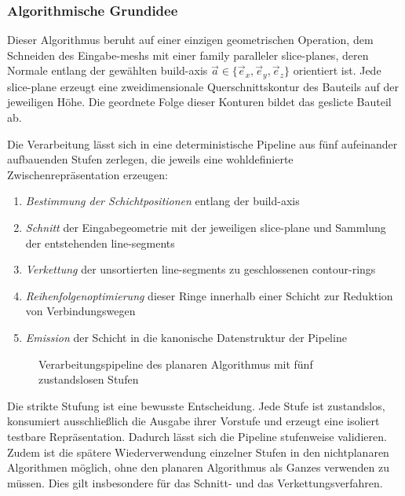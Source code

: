             \subsubsection{Algorithmische Grundidee}\label{subsubsec:concept-planar-core-idea}
                Dieser Algorithmus beruht auf einer einzigen geometrischen Operation, dem Schneiden des Eingabe-\glspl{mesh} mit einer \gls{family} paralleler \glspl{slice-plane}, deren Normale entlang der gewählten \gls{build-axis} $\vec{a} \in \{\vec{e}_x, \vec{e}_y, \vec{e}_z\}$ orientiert ist.
                Jede \gls{slice-plane} erzeugt eine zweidimensionale Querschnittskontur des Bauteils auf der jeweiligen Höhe.
                Die geordnete Folge dieser Konturen bildet das geslicte Bauteil ab.

                Die Verarbeitung lässt sich in eine deterministische Pipeline aus fünf aufeinander aufbauenden Stufen zerlegen, die jeweils eine wohldefinierte Zwischenrepräsentation erzeugen:
                \begin{enumerate}
                    \item \emph{Bestimmung der Schichtpositionen} entlang der \gls{build-axis}
                    \item \emph{Schnitt} der Eingabegeometrie mit der jeweiligen \gls{slice-plane} und Sammlung der entstehenden \glspl{line-segment}
                    \item \emph{Verkettung} der unsortierten \glspl{line-segment} zu geschlossenen \glspl{contour-ring}
                    \item \emph{Reihenfolgenoptimierung} dieser Ringe innerhalb einer Schicht zur Reduktion von Verbindungswegen
                    \item \emph{Emission} der Schicht in die kanonische Datenstruktur der Pipeline
                \end{enumerate}

                \begin{figure}[!ht]
                    \centering
                    
                    \caption[Verarbeitungspipeline des planaren Algorithmus]{
                        Verarbeitungspipeline des planaren Algorithmus mit fünf zustandslosen Stufen
                    }
                    \label{fig:concept-planar-pipeline}
                \end{figure}

                Die strikte Stufung ist eine bewusste Entscheidung.
                Jede Stufe ist zustandslos, konsumiert ausschließlich die Ausgabe ihrer Vorstufe und erzeugt eine isoliert testbare Repräsentation.
                Dadurch lässt sich die Pipeline stufenweise validieren.
                Zudem ist die spätere Wiederverwendung einzelner Stufen in den nichtplanaren Algorithmen möglich, ohne den planaren Algorithmus als Ganzes verwenden zu müssen.
                Dies gilt insbesondere für das Schnitt- und das Verkettungsverfahren.

